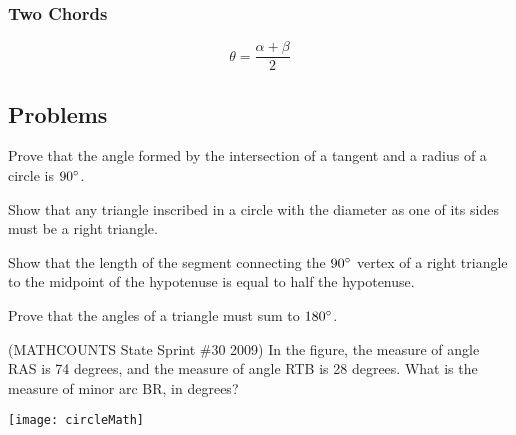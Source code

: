 \subsubsection{Two Chords}
\begin{minipage}{0.6\textwidth}
\begin{center}
\end{center}
\end{minipage}
\begin{minipage}{0.35\textwidth}
$$\theta = \frac{\alpha+\beta}{2}$$
\end{minipage}

\subsection{Problems}
\begin{problem}
Prove that the angle formed by the intersection of a tangent and a radius of a circle is $90\degree$.
\end{problem}
\begin{problem}
Show that any triangle inscribed in a circle with the diameter as one of its sides must be a right triangle.
\end{problem}
\begin{problem}
Show that the length of the segment connecting the $90\degree$ vertex of a right triangle to the midpoint of the hypotenuse is equal to half the hypotenuse.
\end{problem}
\begin{problem}
Prove that the angles of a triangle must sum to $180\degree$.
\end{problem}

\clearpage
\begin{problem}
(MATHCOUNTS State Sprint \#30 2009) In the figure, the measure of angle RAS is 74 degrees, and the measure of angle RTB is 28 degrees. What is the measure of minor arc BR, in degrees?
\begin{center}
\texttt{[image: circleMath]}
\end{center}
\end{problem}
\vspace{1.5in}
